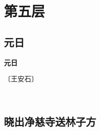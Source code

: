 \documentclass[12pt,UTF-8,openany,fontset=none]{ctexbook}
\begin{document}
\vspace{8pt}
\clearpage

\chapter{第五层}
\clearpage

\section{元日}



\begin{center}
    {\bfseries 元日}
\end{center}

\begin{center}
    \vspace{10pt}
    
    \begin{large}
        
        〔王安石〕
        
    \end{large}
    
    \vspace{8pt}
    
    \begin{huge}
        
        \phantom{。}~~

        \phantom{。}
        
        \phantom{。}

        \phantom{。}
        
    \end{huge}
    
\end{center}

\vspace{8pt}
\clearpage


\section{晓出净慈寺送林子方}


\end{document}
